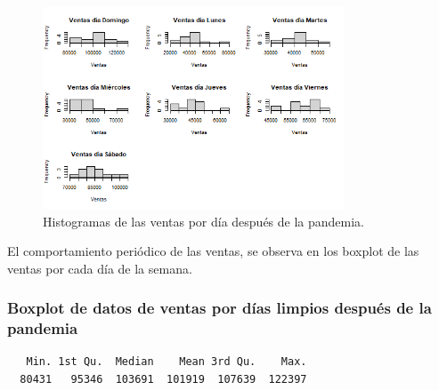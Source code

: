 \documentclass[
  us-letterpaper,
]{scrreprt}
\newenvironment{Shaded}{\begin{snugshade}}{\end{snugshade}}
\newcommand{\FunctionTok}[1]{\textcolor[rgb]{0.28,0.35,0.67}{#1}}
\newcommand{\NormalTok}[1]{\textcolor[rgb]{0.00,0.23,0.31}{#1}}
\newcommand{\SpecialCharTok}[1]{\textcolor[rgb]{0.37,0.37,0.37}{#1}}
\theoremstyle{definition}
\theoremstyle{plain}
\theoremstyle{plain}
\theoremstyle{remark}
\begin{document}
\begin{figure}[H]

{\centering \includegraphics[width=0.8\textwidth,height=\textheight]{his_2.png}

}

\caption{Histogramas de las ventas por día después de la pandemia.}

\end{figure}%

El comportamiento periódico de las ventas, se observa en los boxplot de
las ventas por cada día de la semana.

\subsubsection{Boxplot de datos de ventas por días limpios después de la
pandemia}\label{boxplot-de-datos-de-ventas-por-duxedas-limpios-despuuxe9s-de-la-pandemia}

\begin{Shaded}
\end{Shaded}

\begin{verbatim}
   Min. 1st Qu.  Median    Mean 3rd Qu.    Max. 
  80431   95346  103691  101919  107639  122397 
\end{verbatim}

\begin{Shaded}
\end{Shaded}
\end{document}
